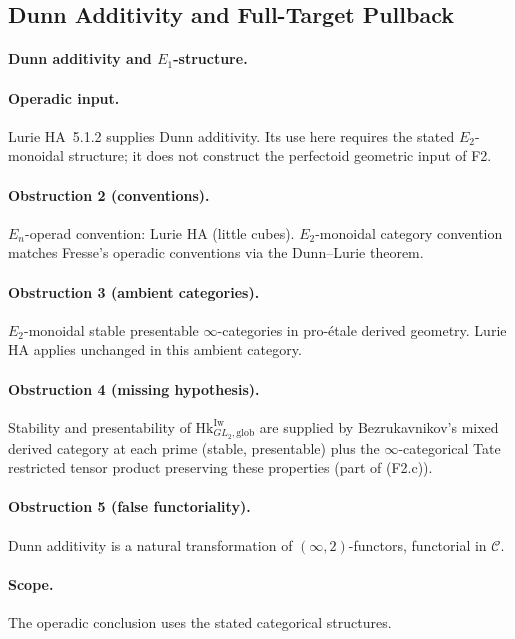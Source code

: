 \subsection{Dunn Additivity and Full-Target Pullback}

\paragraph{Dunn additivity and \(E_{1}\)-structure.}

\paragraph{Operadic input.} Lurie HA~5.1.2 supplies Dunn additivity.
Its use here requires the stated \(E_2\)-monoidal structure; it does
not construct the perfectoid geometric input of F2.

\paragraph{Obstruction 2 (conventions).} \(E_{n}\)-operad convention:
Lurie HA (little cubes). \(E_{2}\)-monoidal category convention
matches Fresse's operadic conventions via the Dunn--Lurie theorem.

\paragraph{Obstruction 3 (ambient categories).} \(E_{2}\)-monoidal
stable presentable \(\infty\)-categories in
pro-\'etale derived geometry. Lurie HA applies unchanged in
this ambient category.

\paragraph{Obstruction 4 (missing hypothesis).} Stability and
presentability of \(\mathrm{Hk}^{\mathrm{Iw}}_{GL_{2},\mathrm{glob}}\)
are supplied by Bezrukavnikov's mixed derived category at each
prime (stable, presentable) plus the \(\infty\)-categorical Tate
restricted tensor product preserving these properties (part of
(F2.c)).

\paragraph{Obstruction 5 (false functoriality).} Dunn additivity is a
natural transformation of \((\infty,2)\)-functors, functorial in
\(\mathcal{C}\).

\paragraph{Scope.} The operadic conclusion uses the stated categorical structures.

